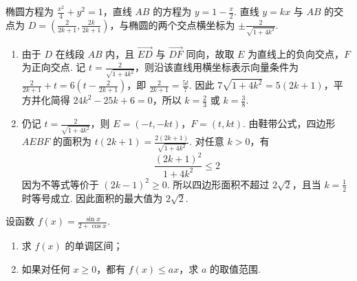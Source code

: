\begin{solution}
椭圆方程为 \(\frac{x^2}{4}+y^2=1\)，直线 \(AB\) 的方程为 \(y=1-\frac{x}{2}\). 直线 \(y=kx\) 与 \(AB\) 的交点为 \(D=\left(\frac{2}{2k+1},\frac{2k}{2k+1}\right)\)，与椭圆的两个交点横坐标为 \(\pm\frac{2}{\sqrt{1+4k^2}}\).

\begin{enumerate}
\item 由于 \(D\) 在线段 \(AB\) 内，且 \(\overrightarrow{ED}\) 与 \(\overrightarrow{DF}\) 同向，故取 \(E\) 为直线上的负向交点，\(F\) 为正向交点. 记 \(t=\frac{2}{\sqrt{1+4k^2}}\)，则沿该直线用横坐标表示向量条件为 \(\frac{2}{2k+1}+t=6\left(t-\frac{2}{2k+1}\right)\)，即 \(\frac{2}{2k+1}=\frac{5t}{7}\). 因此 \(7\sqrt{1+4k^2}=5(2k+1)\)，平方并化简得 \(24k^2-25k+6=0\)，所以 \(k=\frac23\) 或 \(k=\frac38\).
\item 仍记 \(t=\frac{2}{\sqrt{1+4k^2}}\)，则 \(E=(-t,-kt)\)，\(F=(t,kt)\). 由鞋带公式，四边形 \(AEBF\) 的面积为 \(t(2k+1)=\frac{2(2k+1)}{\sqrt{1+4k^2}}\). 对任意 \(k>0\)，有
\[
\frac{(2k+1)^2}{1+4k^2}\leqslant2
\]
因为不等式等价于 \((2k-1)^2\geqslant0\). 所以四边形面积不超过 \(2\sqrt{2}\)，且当 \(k=\frac12\) 时等号成立. 因此面积的最大值为 \(2\sqrt{2}\).
\end{enumerate}
\end{solution}

\begin{problem}
设函数 \(f(x)=\frac{\sin x}{2+\cos x}\).

\begin{enumerate}
\item 求 \(f(x)\) 的单调区间；
\item 如果对任何 \(x\geqslant0\)，都有 \(f(x)\leqslant ax\)，求 \(a\) 的取值范围.
\end{enumerate}
\end{problem}

